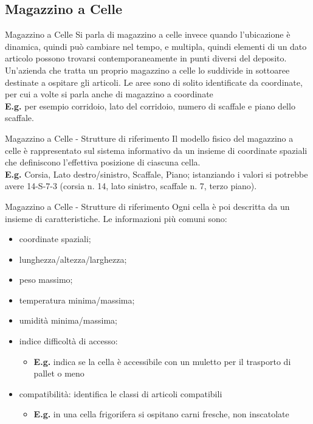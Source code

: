 \documentclass{beamer}
\begin{document}
\subsection{Magazzino a Celle}
\begin{frame}{Magazzino a Celle}
    Si parla di magazzino a celle invece quando l'ubicazione è dinamica, quindi può cambiare nel tempo, e multipla, quindi elementi di un dato articolo possono trovarsi contemporaneamente in punti diversi del deposito.\\
    \vspace{1.5em}
    Un'azienda che tratta un proprio magazzino a celle lo suddivide in sottoaree destinate a ospitare gli articoli. Le aree sono di solito identificate da coordinate, per cui a volte si parla anche di magazzino a coordinate\\
    \vspace{1.5em}
    \textbf{E.g.} per esempio corridoio, lato del corridoio, numero di scaffale e piano dello scaffale.
\end{frame}

\begin{frame}{Magazzino a Celle - Strutture di riferimento}
    Il modello fisico del magazzino a celle è rappresentato sul sistema informativo da un insieme di coordinate spaziali che definiscono l’effettiva posizione di ciascuna cella.\\
    \vspace{1.5em}
    \textbf{E.g.} Corsia, Lato destro/sinistro, Scaffale, Piano; istanziando i valori si potrebbe avere 14-S-7-3 (corsia n. 14, lato sinistro, scaffale n. 7, terzo piano).
    \vspace{1.5em}
\end{frame}

\begin{frame}{Magazzino a Celle - Strutture di riferimento}
    Ogni cella è poi descritta da un insieme di caratteristiche. Le informazioni più comuni sono:
    \begin{itemize}
        \item coordinate spaziali;
        \item lunghezza/altezza/larghezza;
        \item peso massimo;
        \item temperatura minima/massima;
        \item umidità minima/massima;
        \item indice difficoltà di accesso:
        \begin{itemize}
            \item \textbf{E.g.} indica se la cella è accessibile con un muletto per il trasporto di pallet o meno
        \end{itemize}
        \item compatibilità: identifica le classi di articoli compatibili
        \begin{itemize}
            \item \textbf{E.g.} in una cella frigorifera si ospitano carni fresche, non inscatolate
        \end{itemize}
    \end{itemize}
\end{frame}
\end{document}
